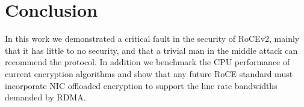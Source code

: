 \section{Conclusion}
\label{sec:conclusion}

In this work we demonstrated a critical fault in the security of RoCEv2, mainly
that it has little to no security, and that a trivial man in the middle attack
can recommend the protocol. In addition we benchmark the CPU performance of
current encryption algorithms and show that any future RoCE standard must
incorporate NIC offloaded encryption to support the line rate bandwidths
demanded by RDMA.
